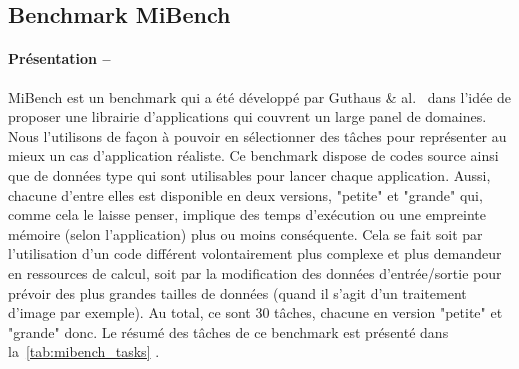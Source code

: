 \documentclass[french, a4paper, 11pt, twoside, pdftex]{StyleThese}
\begin{document}
        \subsection{Benchmark MiBench}
        \paragraph{Présentation --} MiBench est un benchmark qui a été développé par Guthaus \& al.~\cite{guthaus_mibench_2001} dans l'idée de proposer une librairie d'applications qui couvrent un large panel de domaines. Nous l'utilisons de façon à pouvoir en sélectionner des tâches pour représenter au mieux un cas d'application réaliste. 
        Ce benchmark dispose de codes source ainsi que de données type qui sont utilisables pour lancer chaque application. Aussi, chacune d'entre elles est disponible en deux versions, "petite" et "grande" qui, comme cela le laisse penser, implique des temps d'exécution ou une empreinte mémoire (selon l'application) plus ou moins conséquente. Cela se fait soit par l'utilisation d'un code différent volontairement plus complexe et plus demandeur en ressources de calcul, soit par la modification des données d'entrée/sortie pour prévoir des plus grandes tailles de données (quand il s'agit d'un traitement d'image par exemple). Au total, ce sont 30 tâches, chacune en version "petite" et "grande" donc. Le résumé des tâches de ce benchmark est présenté dans la~\autoref{tab:mibench_tasks} .
\end{document}

